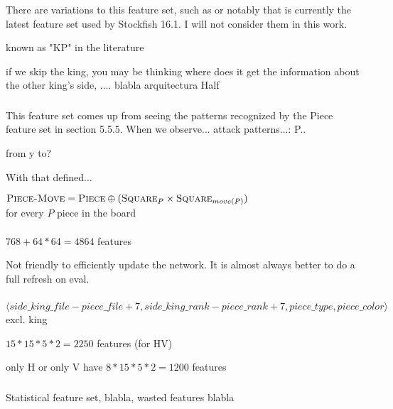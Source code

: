There are variations to this feature set, such as  or notably  that is currently the latest feature set used by Stockfish 16.1. I will not consider them in this work.

known as "KP" in the literature

if we skip the king, you may be thinking where does it get the information about the other king's side, .... blabla arquitectura Half

\subsubsection{\mdseries{}}

This feature set comes up from seeing the patterns recognized by the Piece feature set in section 5.5.5. When we observe... attack patterns...:
P..

from y to?

With that defined...

\begin{center}
    $\textsc{Piece-Move} = \textsc{Piece} \oplus (\textsc{Square}_{P} \times \textsc{Square}_{move(P)})$ \\
    for every $P$ piece in the board \\
    ~\\
    $768 + 64*64=4864$ features
\end{center}

Not friendly to efficiently update the network. It is almost always better to do a full refresh on eval.


\subsubsection{\mdseries{}}


$\langle side\_king\_file - piece\_file + 7, side\_king\_rank - piece\_rank + 7, piece\_type, piece\_color \rangle$ excl. king

$15*15*5*2=2250$ features (for HV)

only H or only V have $8*15*5*2=1200$ features


\subsubsection{\mdseries{}}

Statistical feature set, blabla, wasted features blabla

